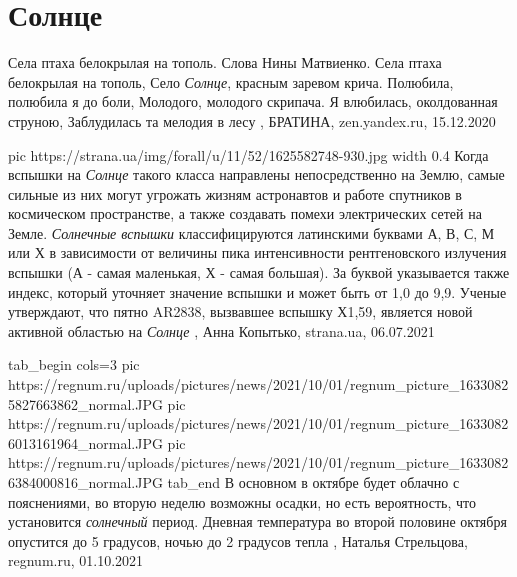  
 
 
 
 
\chapter{Солнце}
\label{sec:slova.solnce}

Села птаха белокрылая на тополь. Слова Нины Матвиенко. Села птаха белокрылая на
тополь, Село \emph{Солнце}, красным заревом крича. Полюбила, полюбила я до
боли, Молодого, молодого скрипача. Я влюбилась, околдованная струною,
Заблудилась та мелодия в лесу
, 
БРАТИНА, zen.yandex.ru, 15.12.2020

\ifcmt
  pic https://strana.ua/img/forall/u/11/52/1625582748-930.jpg
	width 0.4
\fi
Когда вспышки на \emph{Солнце} такого класса направлены непосредственно на Землю,
самые сильные из них могут угрожать жизням астронавтов и работе спутников в
космическом пространстве, а также создавать помехи электрических сетей на
Земле.  \emph{Солнечные вспышки} классифицируются латинскими буквами А, В, С, М или Х
в зависимости от величины пика интенсивности рентгеновского излучения вспышки
(А - самая маленькая, Х - самая большая). За буквой указывается также индекс,
который уточняет значение вспышки и может быть от 1,0 до 9,9.  Ученые
утверждают, что пятно AR2838, вызвавшее вспышку Х1,59, является новой активной
областью на \emph{Солнце}
, 
Анна Копытько, strana.ua, 06.07.2021

\ifcmt
  tab_begin cols=3
     pic https://regnum.ru/uploads/pictures/news/2021/10/01/regnum_picture_16330825827663862_normal.JPG
     pic https://regnum.ru/uploads/pictures/news/2021/10/01/regnum_picture_16330826013161964_normal.JPG
		 pic https://regnum.ru/uploads/pictures/news/2021/10/01/regnum_picture_16330826384000816_normal.JPG
  tab_end
\fi
В основном в октябре будет облачно с пояснениями, во вторую неделю возможны
осадки, но есть вероятность, что установится \emph{солнечный} период. Дневная
температура во второй половине октября опустится до 5 градусов, ночью до 2
градусов тепла
, 
Наталья Стрельцова, regnum.ru, 01.10.2021

